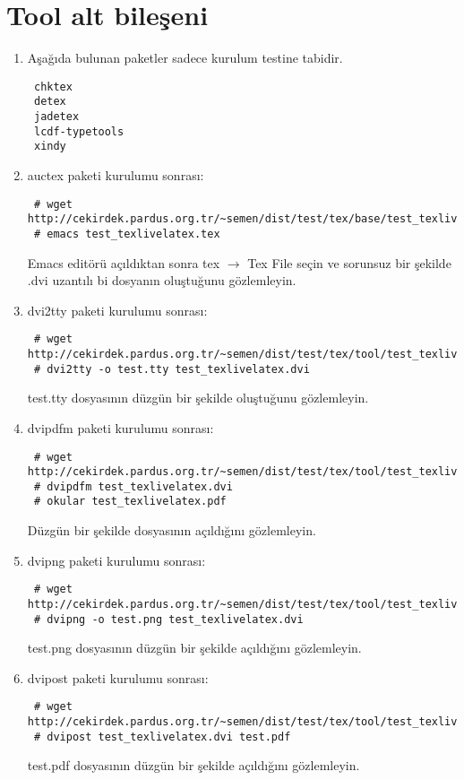 \documentclass[a4paper,10pt]{article}
\begin{document}
\section{Tool alt bileşeni}
\begin{enumerate}
 \item Aşağıda bulunan paketler sadece kurulum testine tabidir.
\begin{verbatim}
 chktex
 detex
 jadetex
 lcdf-typetools
 xindy
\end{verbatim}

 \item auctex paketi kurulumu sonrası:
  
\begin{verbatim}
 # wget http://cekirdek.pardus.org.tr/~semen/dist/test/tex/base/test_texlivelatex.tex
 # emacs test_texlivelatex.tex 
\end{verbatim}

Emacs editörü açıldıktan sonra tex $\rightarrow$ Tex File seçin ve sorunsuz bir şekilde .dvi uzantılı bi dosyanın oluştuğunu gözlemleyin.

 \item dvi2tty paketi kurulumu sonrası:
  
\begin{verbatim}
 # wget http://cekirdek.pardus.org.tr/~semen/dist/test/tex/tool/test_texlivelatex.dvi
 # dvi2tty -o test.tty test_texlivelatex.dvi
\end{verbatim}

test.tty dosyasının düzgün bir şekilde oluştuğunu gözlemleyin.
\item dvipdfm paketi kurulumu sonrası:
  
\begin{verbatim}
 # wget http://cekirdek.pardus.org.tr/~semen/dist/test/tex/tool/test_texlivelatex.dvi
 # dvipdfm test_texlivelatex.dvi
 # okular test_texlivelatex.pdf
\end{verbatim}

 Düzgün bir şekilde dosyasının açıldığını gözlemleyin.
\item dvipng paketi kurulumu sonrası:
 \begin{verbatim}
 # wget http://cekirdek.pardus.org.tr/~semen/dist/test/tex/tool/test_texlivelatex.dvi
 # dvipng -o test.png test_texlivelatex.dvi
 \end{verbatim}

 test.png dosyasının düzgün bir şekilde açıldığını gözlemleyin.
\item dvipost paketi kurulumu sonrası:
  \begin{verbatim}
 # wget http://cekirdek.pardus.org.tr/~semen/dist/test/tex/tool/test_texlivelatex.dvi
 # dvipost test_texlivelatex.dvi test.pdf
 \end{verbatim}
 test.pdf dosyasının düzgün bir şekilde açıldığını gözlemleyin.


\end{enumerate}
\end{document}
